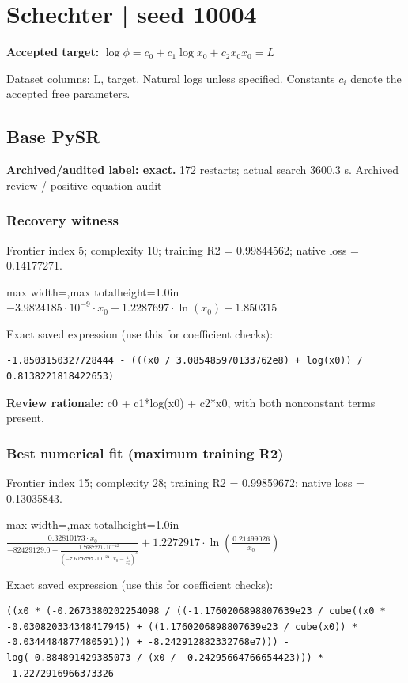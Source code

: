 \documentclass[10pt,letterpaper,landscape]{article}
\begin{document}
\section*{Schechter | seed 10004}
\textbf{Accepted target:} $\displaystyle \log\phi=c_0+c_1\log x_0+c_2x_0$\hfill $x_0=L$\par
{\small Dataset columns: L, target. Natural logs unless specified. Constants $c_i$ denote the accepted free parameters.}\par\medskip
\begin{minipage}[t]{0.485\textwidth}
\subsection*{Base PySR}
\textbf{Archived/audited label: exact.} 172 restarts; actual search 3600.3 s.
{\small Archived review / positive-equation audit}
\subsubsection*{Recovery witness}
Frontier index 5; complexity 10; training R2 = 0.99844562; native loss = 0.14177271.
\begin{center}\begin{adjustbox}{max width=\linewidth,max totalheight=1.0in}$\displaystyle - 3.9824185 \cdot 10^{-9} \cdot x_{0} - 1.2287697 \cdot \ln{\left(x_{0} \right)} - 1.850315$\end{adjustbox}\end{center}
{\scriptsize Exact saved expression (use this for coefficient checks):}
\begin{lstlisting}
-1.8503150327728444 - (((x0 / 3.085485970133762e8) + log(x0)) / 0.8138221818422653)
\end{lstlisting}
{\small\textbf{Review rationale:} c0 + c1*log(x0) + c2*x0, with both nonconstant terms present.}
\subsubsection*{Best numerical fit (maximum training R2)}
Frontier index 15; complexity 28; training R2 = 0.99859672; native loss = 0.13035843.
\begin{center}\begin{adjustbox}{max width=\linewidth,max totalheight=1.0in}$\displaystyle \frac{0.32810173 \cdot x_{0}}{-82429129.0 - \frac{1.7687221 \cdot 10^{-42}}{\left(- 7.6076797 \cdot 10^{-24} \cdot x_{0} - \frac{1}{x_{0}^{3}}\right)^{3}}} + 1.2272917 \cdot \ln{\left(\frac{0.21499026}{x_{0}} \right)}$\end{adjustbox}\end{center}
{\scriptsize Exact saved expression (use this for coefficient checks):}
\begin{lstlisting}
((x0 * (-0.2673380202254098 / ((-1.1760206898807639e23 / cube((x0 * -0.030820334348417945) + ((1.1760206898807639e23 / cube(x0)) * -0.0344484877480591))) + -8.242912882332768e7))) - log(-0.884891429385073 / (x0 / -0.24295664766654423))) * -1.2272916966373326
\end{lstlisting}
\end{minipage}\hfill
\end{document}
